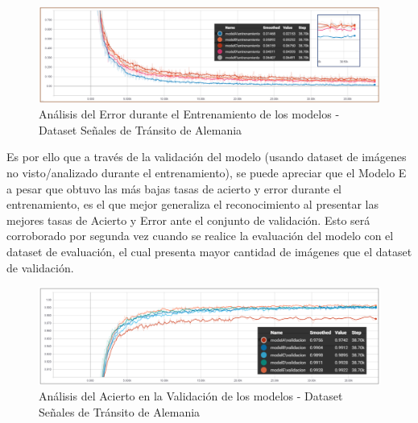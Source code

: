 			\begin{figure}[H]
				\includegraphics[width=1\textwidth, height=\textheight,keepaspectratio]{images/desarrollo/trainResults/germanSummary_entreError} 
				\begin{center}
				\caption{\small{Análisis del Error durante el Entrenamiento de los modelos - Dataset Señales de Tránsito de Alemania}}
				
				{\small{\fontsize{10}{16.8}\selectfont {Fuente: Elaboración propia}}}
				\end{center}
				\vspace{-1.5em}
			\end{figure}	


			Es por ello que a través de la validación del modelo (usando dataset de imágenes no visto/analizado durante el entrenamiento), se puede apreciar que el Modelo E a pesar que obtuvo las más bajas tasas de acierto y error durante el entrenamiento, es el que mejor generaliza el reconocimiento al presentar las mejores tasas de Acierto y Error ante el conjunto de validación. Esto será corroborado por segunda vez cuando se realice la evaluación del modelo con el dataset de evaluación, el cual presenta mayor cantidad de imágenes que el dataset de validación.

			\begin{figure}[H]
				\includegraphics[width=1\textwidth, height=\textheight,keepaspectratio]{images/desarrollo/trainResults/germanSummary_validAcierto} 
				\begin{center}
				\caption{\small{Análisis del Acierto en la Validación de los modelos - Dataset Señales de Tránsito de Alemania}}
				
				{\small{\fontsize{10}{16.8}\selectfont {Fuente: Elaboración propia}}}
				\end{center}
				\vspace{-1.5em}
			\end{figure}

